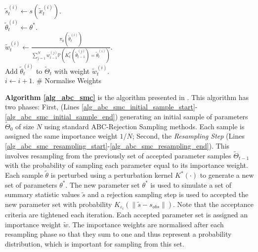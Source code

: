 \documentclass[11pt,a4paper]{article}
\newcommand*{\prob}{\mathbb{P}}
\theoremstyle{break}
\begin{document}
\begin{box_algorithm}
\begin{algorithm}[H]
{{          $\tilde{s}_t^{(i)}\leftarrow s\left(\tilde{x}_t^{(i)}\right)$.\\
           {
            $\tilde\theta_t^{(i)}\leftarrow\theta^*$.\\
            $\tilde{w}_t^{(i)}\leftarrow\frac{\pi_0\left(\tilde\theta_t^{(i)}\right)}{\sum_{j=1}^Nw_{t-1}^{(j)}\prob\left(K_t^*\left(\tilde\theta_{t-1}^{(j)}\right)=\tilde\theta_{t}^{(i)}\right)}$.\label{alg_abc_smc_importance_weight}\\
            Add $\tilde\theta_t^{(i)}$ to $\tilde\Theta_t$ with weight $\tilde{w}_t^{(i)}$.\\
            $i\leftarrow i+1$.
          } 
        }
        \BlankLine
        \# Normalise Weights\\
      }\label{alg_abc_smc_resampling_end}
    \end{algorithm}
  \end{box_algorithm}

  \par \textbf{Algorithm \ref{alg_abc_smc}} is the algorithm presented in \cite[]{adaptive_ABC}. This algorithm has two phases: First, (Lines \ref{alg_abc_smc_initial_sample_start}-\ref{alg_abc_smc_initial_sample_end}) generating an initial sample of parameters $\tilde\Theta_0$ of size $N$ using standard ABC-Rejection Sampling methods. Each sample is assigned the same importance weight $1/N$; Second, the \textit{Resampling Step} (Lines \ref{alg_abc_smc_resampling_start}-\ref{alg_abc_smc_resampling_end}). This involves resampling from the previously set of accepted parameter samples $\tilde\Theta_{t-1}$ with the probability of sampling each parameter equal to its importance weight. Each sample $\tilde\theta$ is perturbed using a perturbation kernel $K^*(\cdot)$ to generate a new set of parameters $\theta^*$. The new parameter set $\theta^*$ is used to simulate a set of summary statistic values $\tilde{s}$ and a rejection sampling step is used to accepted the new parameter set with probability $K_{\varepsilon_t}\left(\left\|\tilde{s}-s_{obs}\right\|\right)$. Note that the acceptance criteria are tightened each iteration. Each accepted parameter set is assigned an importance weight $\tilde{w}$. The importance weights are normalised after each resampling phase so that they sum to one and thus represent a probability distribution, which is important for sampling from this set.
\end{document}
